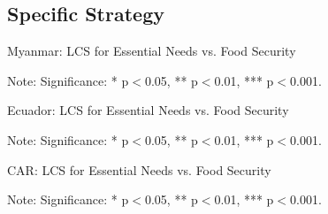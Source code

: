 \documentclass[11pt,harvard]{article}
\begin{document}
\subsection{Specific Strategy}
\begin{table}[htbp]
	\centering
	\begin{adjustbox}{max width=\textwidth}
		\begin{threeparttable}
			\caption{Myanmar: LCS for Essential Needs vs. Food Security}
			\scriptsize
			 
			\label{tab:LCS_F2F_EN_FS_Myanmar}
			\begin{tablenotes}
				\item Note: Significance: * p$<$0.05, ** p$<$0.01, *** p$<$0.001. 
			\end{tablenotes}
		\end{threeparttable}
	\end{adjustbox}
\end{table}

\begin{table}[htbp]
	\centering
	\begin{adjustbox}{max width=\textwidth}
		\begin{threeparttable}
			\caption{Ecuador: LCS for Essential Needs vs. Food Security}
			\scriptsize
			 
			\label{tab:LCS_F2F_EN_FS_Ecuador}
			\begin{tablenotes}
				\item Note: Significance: * p$<$0.05, ** p$<$0.01, *** p$<$0.001. 
			\end{tablenotes}
		\end{threeparttable}
	\end{adjustbox}
\end{table}

\begin{table}[htbp]
	\centering
	\begin{adjustbox}{max width=\textwidth}
		\begin{threeparttable}
			\caption{CAR: LCS for Essential Needs vs. Food Security}
			\scriptsize
			 
			\label{tab:LCS_F2F_EN_FS_CAR}
			\begin{tablenotes}
				\item Note: Significance: * p$<$0.05, ** p$<$0.01, *** p$<$0.001. 
			\end{tablenotes}
		\end{threeparttable}
	\end{adjustbox}
\end{table}
\pagebreak
\end{document}
